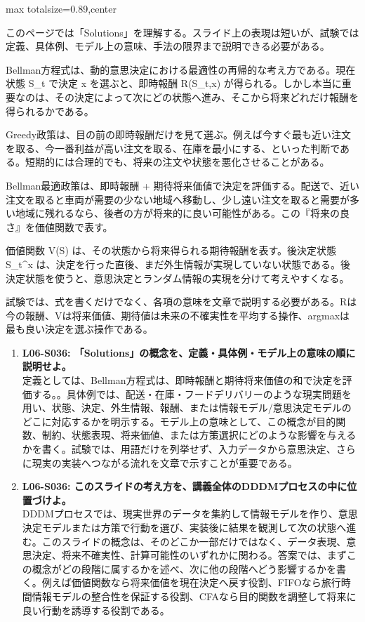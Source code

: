 \begin{minipage}[t]{0.58\textwidth}
\begin{adjustbox}{max totalsize={\textwidth}{0.89\textheight},center}
\begin{minipage}{\textwidth}\scriptsize
{}このページでは「Solutions」を理解する。スライド上の表現は短いが、試験では定義、具体例、モデル上の意味、手法の限界まで説明できる必要がある。\par
Bellman方程式は、動的意思決定における最適性の再帰的な考え方である。現在状態 S\_t で決定 x を選ぶと、即時報酬 R(S\_t,x) が得られる。しかし本当に重要なのは、その決定によって次にどの状態へ進み、そこから将来どれだけ報酬を得られるかである。\par
Greedy政策は、目の前の即時報酬だけを見て選ぶ。例えば今すぐ最も近い注文を取る、今一番利益が高い注文を取る、在庫を最小にする、といった判断である。短期的には合理的でも、将来の注文や状態を悪化させることがある。\par
Bellman最適政策は、即時報酬 + 期待将来価値で決定を評価する。配送で、近い注文を取ると車両が需要の少ない地域へ移動し、少し遠い注文を取ると需要が多い地域に残れるなら、後者の方が将来的に良い可能性がある。この『将来の良さ』を価値関数で表す。\par
価値関数 V(S) は、その状態から将来得られる期待報酬を表す。後決定状態 S\_t\textasciicircum{}x は、決定を行った直後、まだ外生情報が実現していない状態である。後決定状態を使うと、意思決定とランダム情報の実現を分けて考えやすくなる。\par
試験では、式を書くだけでなく、各項の意味を文章で説明する必要がある。Rは今の報酬、Vは将来価値、期待値は未来の不確実性を平均する操作、argmaxは最も良い決定を選ぶ操作である。\par{}\begin{enumerate}\item \textbf{L06-S036: 「Solutions」の概念を、定義・具体例・モデル上の意味の順に説明せよ。}\\定義としては、Bellman方程式は、即時報酬と期待将来価値の和で決定を評価する。。具体例では、配送・在庫・フードデリバリーのような現実問題を用い、状態、決定、外生情報、報酬、または情報モデル/意思決定モデルのどこに対応するかを明示する。モデル上の意味として、この概念が目的関数、制約、状態表現、将来価値、または方策選択にどのような影響を与えるかを書く。試験では、用語だけを列挙せず、入力データから意思決定、さらに現実の実装へつながる流れを文章で示すことが重要である。\item \textbf{L06-S036: このスライドの考え方を、講義全体のDDDMプロセスの中に位置づけよ。}\\DDDMプロセスでは、現実世界のデータを集約して情報モデルを作り、意思決定モデルまたは方策で行動を選び、実装後に結果を観測して次の状態へ進む。このスライドの概念は、そのどこか一部だけではなく、データ表現、意思決定、将来不確実性、計算可能性のいずれかに関わる。答案では、まずこの概念がどの段階に属するかを述べ、次に他の段階へどう影響するかを書く。例えば価値関数なら将来価値を現在決定へ戻す役割、FIFOなら旅行時間情報モデルの整合性を保証する役割、CFAなら目的関数を調整して将来に良い行動を誘導する役割である。\end{enumerate}

\end{minipage}
\end{adjustbox}
\end{minipage}
